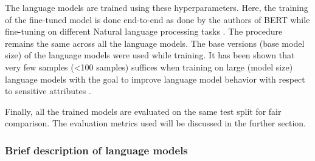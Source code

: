 \begin{table}[h!]
\caption{Hyperparameter search results for language models}
\label{tab:search_results}
\end{table}

The language models are trained using these hyperparameters. Here, the training of the fine-tuned model is done end-to-end as done by the authors of BERT while fine-tuning on different Natural language processing tasks \cite{devlin2018bert}. The procedure remains the same across all the language models. The base versions (base model size) of the language models were used while training. It has been shown that very few samples (<100 samples) suffices when training on large (model size) language models with the goal to improve language model behavior with respect to sensitive attributes \cite{solaiman2021process}. 

Finally, all the trained models are evaluated on the same test split for fair comparison. The evaluation metrics used will be discussed in the further section.


\subsubsection{Brief description of language models}

